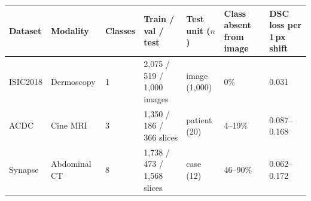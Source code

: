 \begin{tabular}{lllllll}
\toprule
Dataset & Modality & Classes & Train / val / test & Test unit ($n$) & Class absent from image & DSC loss per 1\,px shift \\
\midrule
ISIC2018 & Dermoscopy & 1 & 2,075 / 519 / 1,000 images & image (1,000) & 0\% & 0.031 \\
ACDC & Cine MRI & 3 & 1,350 / 186 / 366 slices & patient (20) & 4--19\% & 0.087--0.168 \\
Synapse & Abdominal CT & 8 & 1,738 / 473 / 1,568 slices & case (12) & 46--90\% & 0.062--0.172 \\
\bottomrule
\end{tabular}
